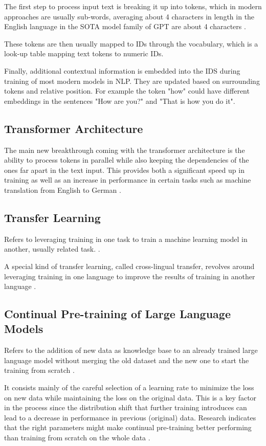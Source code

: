 The first step to process input text is breaking it up into tokens, which in modern approaches are usually sub-words, averaging about 4 characters in length in the English language in the SOTA model family of GPT are about 4 characters \cite{OpenAITokens}.

These tokens are then usually mapped to IDs through the vocabulary, which is a look-up table mapping text tokens to numeric IDs.

Finally, additional contextual information is embedded into the IDS during training of most modern models in NLP. They are updated based on surrounding tokens and relative position. For example the token "how" could have different embeddings in the sentences "How are you?" and "That is how you do it".


\subsection{Transformer Architecture}


The main new breakthrough coming with the transformer architecture is the ability to process tokens in parallel while also keeping the dependencies of the ones far apart in the text input. This provides both a significant speed up in training as well as an increase in performance in certain tasks such as machine translation from English to German \cite{vaswani2017attention}.

\subsection{Transfer Learning}

Refers to leveraging training in one task to train a machine learning model in another, usually related task. \cite{torrey2010transfer}. 

A special kind of transfer learning, called cross-lingual transfer, revolves around leveraging training in one language to improve the results of training in another language \cite{cross_lingual_transfer}.

\subsection{Continual Pre-training of Large Language Models}
Refers to the addition of new data as knowledge base to an already trained large language model without merging the old dataset and the new one to start the training from scratch \cite{gupta2023continual}.

It consists mainly of the careful selection of a learning rate to minimize the loss on new data while maintaining the loss on the original data. This is a key factor in the process since the distribution shift that further training introduces can lead to a decrease in performance in previous (original) data. Research indicates that the right parameters might make continual pre-training better performing than training from scratch on the whole data \cite{gupta2023continual}.


